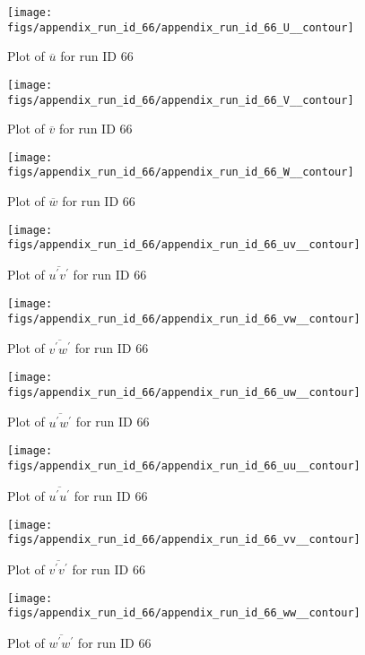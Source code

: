 \begin{figure}[H]
\centering
\texttt{[image: figs/appendix\_run\_id\_66/appendix\_run\_id\_66\_U\_\_contour]}
\caption{Plot of $\overline{u}$ for run ID 66}
\label{fig:appendix_run_id_66_U__contour}
\end{figure}


\begin{figure}[H]
\centering
\texttt{[image: figs/appendix\_run\_id\_66/appendix\_run\_id\_66\_V\_\_contour]}
\caption{Plot of $\overline{v}$ for run ID 66}
\label{fig:appendix_run_id_66_V__contour}
\end{figure}


\begin{figure}[H]
\centering
\texttt{[image: figs/appendix\_run\_id\_66/appendix\_run\_id\_66\_W\_\_contour]}
\caption{Plot of $\overline{w}$ for run ID 66}
\label{fig:appendix_run_id_66_W__contour}
\end{figure}


\begin{figure}[H]
\centering
\texttt{[image: figs/appendix\_run\_id\_66/appendix\_run\_id\_66\_uv\_\_contour]}
\caption{Plot of $\overline{u^\prime v^\prime}$ for run ID 66}
\label{fig:appendix_run_id_66_uv__contour}
\end{figure}


\begin{figure}[H]
\centering
\texttt{[image: figs/appendix\_run\_id\_66/appendix\_run\_id\_66\_vw\_\_contour]}
\caption{Plot of $\overline{v^\prime w^\prime}$ for run ID 66}
\label{fig:appendix_run_id_66_vw__contour}
\end{figure}


\begin{figure}[H]
\centering
\texttt{[image: figs/appendix\_run\_id\_66/appendix\_run\_id\_66\_uw\_\_contour]}
\caption{Plot of $\overline{u^\prime w^\prime}$ for run ID 66}
\label{fig:appendix_run_id_66_uw__contour}
\end{figure}


\begin{figure}[H]
\centering
\texttt{[image: figs/appendix\_run\_id\_66/appendix\_run\_id\_66\_uu\_\_contour]}
\caption{Plot of $\overline{u^\prime u^\prime}$ for run ID 66}
\label{fig:appendix_run_id_66_uu__contour}
\end{figure}


\begin{figure}[H]
\centering
\texttt{[image: figs/appendix\_run\_id\_66/appendix\_run\_id\_66\_vv\_\_contour]}
\caption{Plot of $\overline{v^\prime v^\prime}$ for run ID 66}
\label{fig:appendix_run_id_66_vv__contour}
\end{figure}


\begin{figure}[H]
\centering
\texttt{[image: figs/appendix\_run\_id\_66/appendix\_run\_id\_66\_ww\_\_contour]}
\caption{Plot of $\overline{w^\prime w^\prime}$ for run ID 66}
\label{fig:appendix_run_id_66_ww__contour}
\end{figure}


